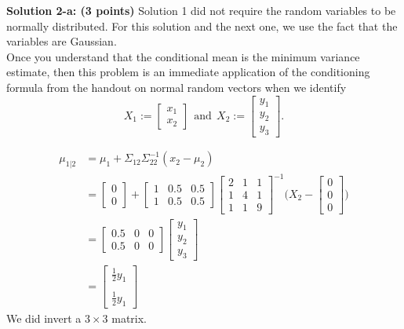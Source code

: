 \documentclass[letterpaper]{article}
\begin{document}
 \noindent \textbf{Solution 2-a: (3 points)} Solution 1 did not require the random variables to be normally distributed. For this solution and the next one, we use the fact that the variables are Gaussian. \\

Once you understand that the conditional mean is the minimum variance estimate, then this problem is an immediate application of the conditioning formula from the handout on normal random vectors when we identify
 $$X_1:=\begin{bmatrix} x_1 \\ x_2 \end{bmatrix}~~\text{and}~~X_2:=\begin{bmatrix} y_1 \\ y_2 \\ y_3\end{bmatrix}.$$

\begin{align*}
\mu_{1|2} &= \mu_1 + \Sigma_{12}\Sigma^{-1}_{22} (x_2 - \mu_2 ) \\
& =\begin{bmatrix} 0 \\ 0\end{bmatrix}  + \left[ \begin{array}{ccc} 1 & 0.5 & 0.5 \\  1 & 0.5 & 0.5\end{array} \right] \left[ \begin{array}{ccc} 2 & 1 & 1 \\1 & 4 & 1\\ 1& 1 & 9  \end{array} \right]^{-1}\big( X_2 - \begin{bmatrix} 0 \\0\\ 0 \end{bmatrix}  \big)\\
&= \left[ \begin{array}{ccc} 0.5 & 0& 0\\  0.5 & 0& 0\end{array} \right] \begin{bmatrix} y_1 \\ y_2 \\ y_3\end{bmatrix}\\
&=  \begin{bmatrix} \frac{1}{2}y_1 \\  \\\frac{1}{2}y_1 \end{bmatrix}
\end{align*}
We did invert a $3 \times 3$ matrix.
\end{document}
